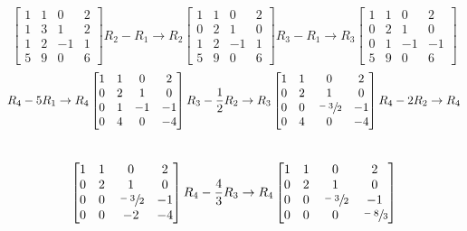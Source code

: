 \[
    \begin{bmatrix}
        1 & 1 & 0  & 2 \\
        1 & 3 & 1  & 2 \\
        1 & 2 & -1 & 1 \\
        5 & 9 & 0  & 6
    \end{bmatrix}
    R_2 - R_1 \to R_2
    \begin{bmatrix}
        1 & 1 & 0  & 2 \\
        0 & 2 & 1  & 0 \\
        1 & 2 & -1 & 1 \\
        5 & 9 & 0  & 6
    \end{bmatrix}
    R_3 - R_1 \to  R_3
    \begin{bmatrix}
        1 & 1 & 0  & 2  \\
        0 & 2 & 1  & 0  \\
        0 & 1 & -1 & -1 \\
        5 & 9 & 0  & 6
    \end{bmatrix}
\]
\[
    R_4 - 5R_1\to  R_4
    \begin{bmatrix}
        1 & 1 & 0  & 2  \\
        0 & 2 & 1  & 0  \\
        0 & 1 & -1 & -1 \\
        0 & 4 & 0  & -4
    \end{bmatrix}
    R_3 - \frac{1}{2} R_2\to  R_3
    \begin{bmatrix}
        1 & 1 & 0             & 2  \\
        0 & 2 & 1             & 0  \\
        0 & 0 & \sfrac{-3}{2} & -1 \\
        0 & 4 & 0             & -4
    \end{bmatrix}
    R_4 - 2R_2 \to R_4
\]
\\
\[
    \begin{bmatrix}
        1 & 1 & 0             & 2  \\
        0 & 2 & 1             & 0  \\
        0 & 0 & \sfrac{-3}{2} & -1 \\
        0 & 0 & -2            & -4
    \end{bmatrix}
    R_4 - \frac{4}{3}R_3 \to R_4
    \begin{bmatrix}
        1 & 1 & 0             & 2             \\
        0 & 2 & 1             & 0             \\
        0 & 0 & \sfrac{-3}{2} & -1            \\
        0 & 0 & 0             & \sfrac{-8}{3}
    \end{bmatrix}
\]
\\


